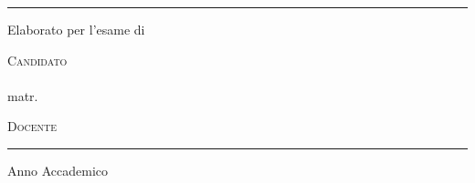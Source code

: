 \begin{titlepage}
\centering

{\large\scshape \ateneo \par}
\vspace{2pt}
{\normalsize \dipartimento \par}
\vspace{6pt}
{\normalsize \corso \par}

\vspace{4pt}
\rule{\textwidth}{0.4pt}

\vfill

{\normalsize Elaborato per l'esame di \par}
\vspace{4pt}
{\large\bfseries \corsoEsame \par}

\vspace{1.6cm}

{\huge\bfseries \titoloElaborato \par}
\vspace{0.6cm}
{\large\itshape \sottotitoloElaborato \par}

\vfill

\begin{minipage}[t]{0.48\textwidth}
  \raggedright
  {\small\scshape Candidato}\\[2pt]
  {\large \autore}\\[2pt]
  {\small matr.\ \matricola}
\end{minipage}\hfill
\begin{minipage}[t]{0.48\textwidth}
  \raggedleft
  {\small\scshape Docente}\\[2pt]
  {\large \docente}
\end{minipage}

\vspace{1.4cm}
\rule{\textwidth}{0.4pt}
\vspace{4pt}

{\normalsize Anno Accademico \annoacc \par}

\end{titlepage}
